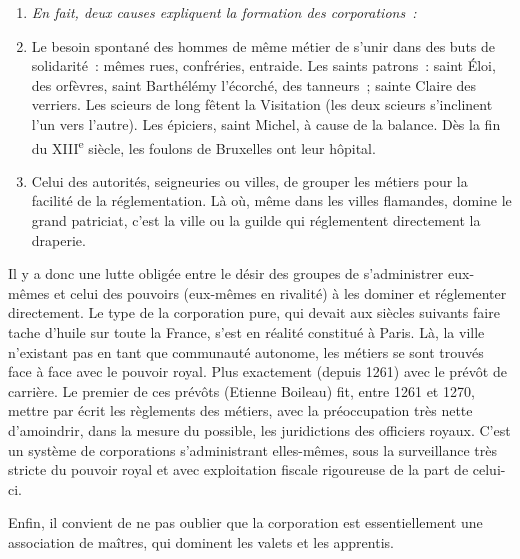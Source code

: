 \documentclass[french,twoside]{book} %
\newlength{\listmod}
\newcommand{\listhead}[1]{\hspace{-1\listmod}\emph{#1}}
\begin{document}
\begin{enumerate}[itemsep=0pt,]
\item[]\listhead{En fait, deux causes expliquent la formation des corporations :}
\item Le besoin spontané des hommes de même métier de s’unir dans des buts de solidarité : mêmes rues, confréries, entraide. Les saints patrons : saint Éloi, des orfèvres, saint Barthélémy l’écorché, des tanneurs ; sainte Claire des verriers. Les scieurs de long fêtent la Visitation (les deux scieurs s’inclinent l’un vers l’autre). Les épiciers, saint Michel, à cause de la balance. Dès la fin du XIII\textsuperscript{e} siècle, les foulons de Bruxelles ont leur hôpital.
\item Celui des autorités, seigneuries ou villes, de grouper les métiers pour la facilité de la réglementation. Là où, même dans les villes flamandes, domine le grand patriciat, c’est la ville ou la guilde qui réglementent directement la draperie.
\end{enumerate}

\noindent Il y a donc une lutte obligée entre le désir des groupes de s’administrer eux-mêmes et celui des pouvoirs (eux-mêmes en rivalité) à les dominer et réglementer directement. Le type de la corporation pure, qui devait aux siècles suivants faire tache d’huile sur toute la France, s’est en réalité constitué à Paris. Là, la ville n’existant pas en tant que communauté autonome, les métiers se sont trouvés face à face avec le pouvoir royal. Plus exactement (depuis 1261) avec le prévôt de carrière. Le premier de ces prévôts (Etienne Boileau) fit, entre 1261 et 1270, mettre par écrit les règlements des métiers, avec la préoccupation très nette d’amoindrir,  
\label{p99} dans la mesure du possible, les juridictions des officiers royaux. C’est un système de corporations s’administrant elles-mêmes, sous la surveillance très stricte du pouvoir royal et avec exploitation fiscale rigoureuse de la part de celui-ci.\par
Enfin, il convient de ne pas oublier que la corporation est essentiellement une association de maîtres, qui dominent les valets et les apprentis.\par
\end{document}
